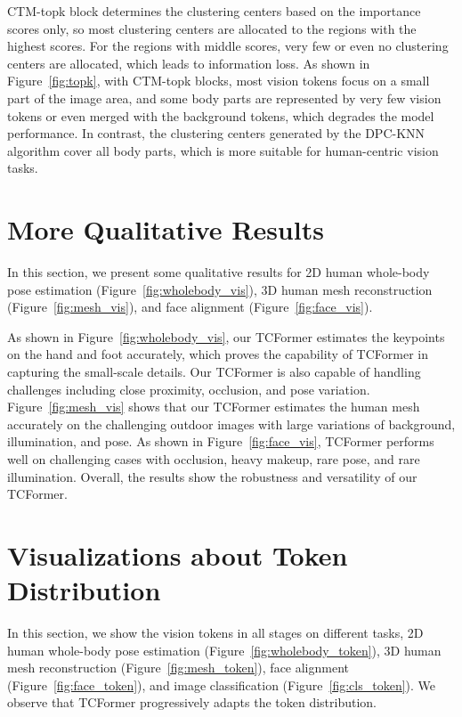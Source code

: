 \documentclass[10pt,twocolumn,letterpaper]{article}
\begin{document}
CTM-topk block determines the clustering centers based on the importance scores only, so most clustering centers are allocated to the regions with the highest scores. For the regions with middle scores, very few or even no clustering centers are allocated, which leads to information loss.
As shown in Figure~\ref{fig:topk}, with CTM-topk blocks, most vision tokens focus on a small part of the image area, and some body parts are represented by very few vision tokens or even merged with the background tokens, which degrades the model performance. 
In contrast, the clustering centers generated by the DPC-KNN algorithm cover all body parts, which is more suitable for human-centric vision tasks. 




\section{More Qualitative Results}
In this section, we present some qualitative results for 2D human whole-body pose estimation (Figure~\ref{fig:wholebody_vis}), 3D human mesh reconstruction (Figure~\ref{fig:mesh_vis}), and face alignment (Figure~\ref{fig:face_vis}).

As shown in Figure~\ref{fig:wholebody_vis}, our TCFormer estimates the keypoints on the hand and foot accurately, which proves the capability of TCFormer in capturing the small-scale details. Our TCFormer is also capable of handling challenges including close proximity, occlusion, and pose variation.
Figure~\ref{fig:mesh_vis} shows that our TCFormer estimates the human mesh accurately on the challenging outdoor images with large variations of background, illumination, and pose.
As shown in Figure~\ref{fig:face_vis}, TCFormer performs well on challenging cases with occlusion, heavy makeup, rare pose, and rare illumination.
Overall, the results show the robustness and versatility of our TCFormer.









\section{Visualizations about Token Distribution}
In this section, we show the vision tokens in all stages on different tasks, \ie 2D human whole-body pose estimation (Figure~\ref{fig:wholebody_token}), 3D human mesh reconstruction (Figure~\ref{fig:mesh_token}), face alignment (Figure~\ref{fig:face_token}), and image classification (Figure~\ref{fig:cls_token}).
We observe that TCFormer progressively adapts the token distribution.
\end{document}
